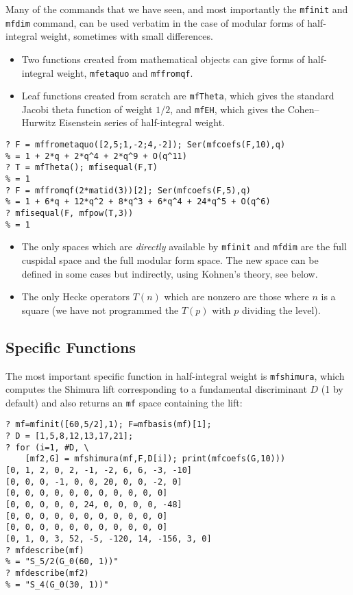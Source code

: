 \documentclass[11pt]{article}
\def\kbd#1{{\tt #1}}
\begin{document}
Many of the commands that we have seen, and most importantly the
\kbd{mfinit} and \kbd{mfdim} command, can be used verbatim in the case
of modular forms of half-integral weight, sometimes with small differences.
\begin{itemize}
\item Two functions created from mathematical objects can give forms
of half-integral weight, \kbd{mfetaquo} and \kbd{mffromqf}.

\item Leaf functions created from scratch are \kbd{mfTheta}, which gives the
standard Jacobi theta function of weight $1/2$, and \kbd{mfEH}, which gives
the Cohen--Hurwitz Eisenstein series of half-integral weight.

\end{itemize}

\begin{verbatim}
? F = mffrometaquo([2,5;1,-2;4,-2]); Ser(mfcoefs(F,10),q)
% = 1 + 2*q + 2*q^4 + 2*q^9 + O(q^11)
? T = mfTheta(); mfisequal(F,T)
% = 1
? F = mffromqf(2*matid(3))[2]; Ser(mfcoefs(F,5),q)
% = 1 + 6*q + 12*q^2 + 8*q^3 + 6*q^4 + 24*q^5 + O(q^6)
? mfisequal(F, mfpow(T,3))
% = 1
\end{verbatim}

\begin{itemize}\item The only spaces which are \emph{directly} available
by \kbd{mfinit} and \kbd{mfdim} are the full cuspidal space and the full
modular form space. The new space can be defined in some cases but indirectly,
using Kohnen's theory, see below.
\item The only Hecke operators $T(n)$ which are nonzero are those where
$n$ is a square (we have not programmed the $T(p)$ with $p$ dividing the
level).
\end{itemize}

\subsection{Specific Functions}

The most important specific function in half-integral weight is
\kbd{mfshimura}, which computes the Shimura lift corresponding to a
fundamental discriminant $D$ (1 by default) and also returns an \kbd{mf} space
containing the lift:

\begin{verbatim}
? mf=mfinit([60,5/2],1); F=mfbasis(mf)[1];
? D = [1,5,8,12,13,17,21];
? for (i=1, #D, \
    [mf2,G] = mfshimura(mf,F,D[i]); print(mfcoefs(G,10)))
[0, 1, 2, 0, 2, -1, -2, 6, 6, -3, -10]
[0, 0, 0, -1, 0, 0, 20, 0, 0, -2, 0]
[0, 0, 0, 0, 0, 0, 0, 0, 0, 0, 0]
[0, 0, 0, 0, 0, 24, 0, 0, 0, 0, -48]
[0, 0, 0, 0, 0, 0, 0, 0, 0, 0, 0]
[0, 0, 0, 0, 0, 0, 0, 0, 0, 0, 0]
[0, 1, 0, 3, 52, -5, -120, 14, -156, 3, 0]
? mfdescribe(mf)
% = "S_5/2(G_0(60, 1))"
? mfdescribe(mf2)
% = "S_4(G_0(30, 1))"
\end{verbatim}
\end{document}
